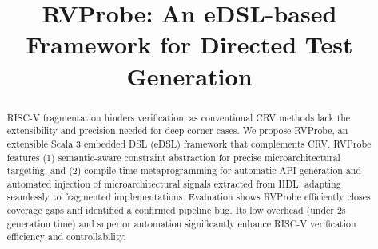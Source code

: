 \documentclass[sigconf]{acmart}
\begin{document}
\title{RVProbe: An eDSL-based Framework for Directed Test Generation}


\begin{abstract}
RISC-V fragmentation hinders verification, as conventional CRV methods lack the extensibility and precision needed for deep corner cases. We propose RVProbe, an extensible Scala 3 embedded DSL (eDSL) framework that complements CRV. RVProbe features (1) semantic-aware constraint abstraction for precise microarchitectural targeting, and (2) compile-time metaprogramming for automatic API generation and automated injection of microarchitectural signals extracted from HDL, adapting seamlessly to fragmented implementations. Evaluation shows RVProbe efficiently closes coverage gaps and identified a confirmed pipeline bug. Its low overhead (under 2s generation time) and superior automation significantly enhance RISC-V verification efficiency and controllability.
\end{abstract}

\end{document}
